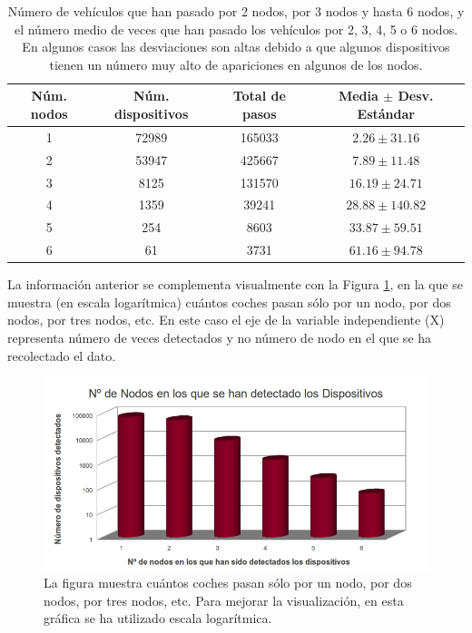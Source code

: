 \documentclass[twocolumn,twoside]{Jornadas}
\begin{document}
 \begin{table}[hptb]
 \caption{Número de vehículos que han pasado por 2 nodos, por 3 nodos y hasta 6 nodos, y el número medio de veces que han pasado los vehículos por 2, 3, 4, 5 o 6 nodos. En algunos casos las desviaciones son altas debido a que algunos dispositivos tienen un número muy alto de apariciones en algunos de los nodos.
 \label{tNodosPorDondePasan}}
 \begin{center}
 \begin{tabular}{|c|c|c|c|}
 \hline
 Núm. nodos & 	Núm. dispositivos & 	Total de pasos & 	Media $\pm$ Desv. Estándar  \\
 \hline
1 & 	72989 & 	 165033 & 	$2.26 \pm 31.16$  \\
 \hline
2 & 	53947 & 	 425667 & 	$7.89 \pm 11.48$  \\
 \hline
3 & 	8125 & 	 131570 & 	$16.19 \pm 24.71$  \\
 \hline
4 & 	1359 & 	 39241 & 	$28.88 \pm 140.82$  \\
 \hline
5 & 	254 & 	 8603 & 	$33.87 \pm 59.51$  \\
 \hline
6 & 	61 & 	 3731 & 	$61.16 \pm 94.78$  \\
 \hline
 \end{tabular}
 \end{center}
 \end{table}

La información anterior se complementa visualmente con la Figura \ref{fNodosPorDondePasan}, en la que se muestra (en escala logarítmica) cuántos coches pasan sólo 
por un nodo, por dos nodos, por tres nodos, etc. En este caso el eje de la variable independiente (X) representa número de veces detectados y no número de nodo en el que se ha 
recolectado el dato.

 \begin{figure}[htb]
 \begin{center}
 \includegraphics[scale=0.20]{NodosPorDondePasan.jpg}
 \caption{La figura muestra cuántos coches pasan sólo por un nodo, por dos nodos, por tres nodos, etc. Para mejorar la visualización, en esta gráfica se ha utilizado escala logarítmica.
 \label{fNodosPorDondePasan}}
 \end{center}
 \end{figure}
\end{document}
